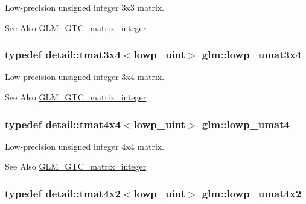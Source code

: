 Low-\/precision unsigned integer 3x3 matrix. 

\begin{DoxySeeAlso}{See Also}
\hyperlink{group__gtc__matrix__integer}{G\-L\-M\-\_\-\-G\-T\-C\-\_\-matrix\-\_\-integer} 
\end{DoxySeeAlso}
\hypertarget{group__gtc__matrix__integer_gace8e281261bb90e62c67444ec0c9e7e7}{
\subsubsection[{lowp\-\_\-umat3x4}]{\setlength{\rightskip}{0pt plus 5cm}typedef detail\-::tmat3x4$<$lowp\-\_\-uint$>$ {\bf glm\-::lowp\-\_\-umat3x4}}}\label{group__gtc__matrix__integer_gace8e281261bb90e62c67444ec0c9e7e7}


Low-\/precision unsigned integer 3x4 matrix. 

\begin{DoxySeeAlso}{See Also}
\hyperlink{group__gtc__matrix__integer}{G\-L\-M\-\_\-\-G\-T\-C\-\_\-matrix\-\_\-integer} 
\end{DoxySeeAlso}
\hypertarget{group__gtc__matrix__integer_ga8c3fe5b40073668893a32bd07b7a64a1}{
\subsubsection[{lowp\-\_\-umat4}]{\setlength{\rightskip}{0pt plus 5cm}typedef detail\-::tmat4x4$<$lowp\-\_\-uint$>$ {\bf glm\-::lowp\-\_\-umat4}}}\label{group__gtc__matrix__integer_ga8c3fe5b40073668893a32bd07b7a64a1}


Low-\/precision unsigned integer 4x4 matrix. 

\begin{DoxySeeAlso}{See Also}
\hyperlink{group__gtc__matrix__integer}{G\-L\-M\-\_\-\-G\-T\-C\-\_\-matrix\-\_\-integer} 
\end{DoxySeeAlso}
\hypertarget{group__gtc__matrix__integer_gacc7fd3996cf8cb661099c95a0363d051}{
\subsubsection[{lowp\-\_\-umat4x2}]{\setlength{\rightskip}{0pt plus 5cm}typedef detail\-::tmat4x2$<$lowp\-\_\-uint$>$ {\bf glm\-::lowp\-\_\-umat4x2}}}\label{group__gtc__matrix__integer_gacc7fd3996cf8cb661099c95a0363d051}


